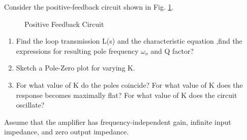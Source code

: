 Consider the positive-feedback circuit shown in Fig. \ref{fig:ee18btech11030}. 
\begin{figure}[!ht]
	\begin{center}
		\resizebox{\columnwidth/1}{!}{}
	\end{center}
	\caption{ Positive Feedback Circuit}
	\label{fig:ee18btech11030}
\end{figure}
\begin{enumerate}[label=(\alph*),ref=\theenumi]

\item Find the loop transmission L(s) and the characteristic equation ,find the expressions for resulting pole frequency $\omega_o$ and Q factor?
\item Sketch a Pole-Zero plot for varying K. 
\item For what value of K do the poles coincide? For what value of K does the response becomes maximally flat? For what value of K does the circuit oscillate?
\end{enumerate}
Assume that the amplifier has frequency-independent gain, infinite input impedance, and zero output impedance.

